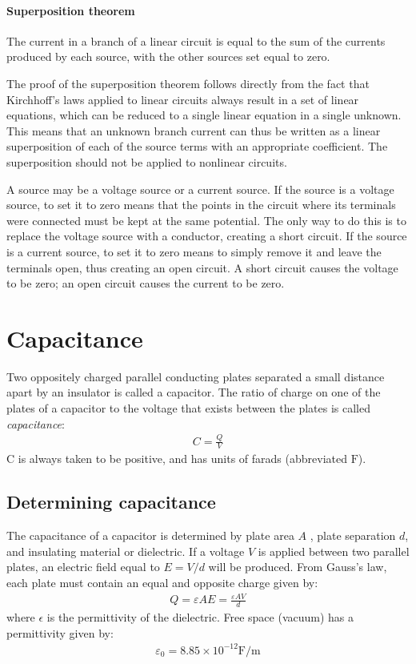 \documentclass[../../document]{subfiles}
\begin{document}
\paragraph*{Superposition theorem}
The current in a branch of a linear circuit is equal to the sum of the currents
produced by each source, with the other sources set equal to zero.
\cite{practical_electronics}

The proof of the superposition theorem follows directly from the fact that
Kirchhoff’s laws applied to linear circuits always result in a set of linear
equations, which can be reduced to a single linear equation in a single
unknown. This means that an unknown branch current can thus be written as a
linear superposition of each of the source terms with an appropriate
coefficient. The superposition should not be applied to nonlinear circuits.
\cite{practical_electronics}

A source may be a voltage source or a current source. If the source is a
voltage source, to set it to zero means that the points in the circuit where
its terminals were connected must be kept at the same potential. The only way
to do this is to replace the voltage source with a conductor, creating a short
circuit. If the source is a current source, to set it to zero means to simply
remove it and leave the terminals open, thus creating an open circuit. A short
circuit causes the voltage to be zero; an open circuit causes the current to be
zero. \cite{practical_electronics}

\section{Capacitance}
Two oppositely charged parallel conducting plates separated a small distance
apart by an insulator is called a capacitor. The
ratio of charge on one of the plates of a capacitor to the voltage that exists
between the plates is called \emph{capacitance}: \cite{practical_electronics}
\begin{gather}
	C=\frac{Q}{V}
\end{gather}
C is always taken to be positive, and has units of farads (abbreviated
\(\unit{\farad}\)). \cite{practical_electronics}

\subsection{Determining capacitance}
The capacitance of a capacitor is determined by plate area \(A\) , plate
separation \(d\), and insulating material or dielectric. If a voltage \(V\)  is
applied between two parallel plates, an electric field equal to \(E = V/d\)
will be produced. From Gauss’s law, each plate must contain an equal and
opposite charge given by:
\begin{gather}
	Q=\varepsilon AE = \frac{\varepsilon AV}{d}
\end{gather}
where \(\epsilon\)  is the permittivity of the dielectric.
Free space (vacuum) has a permittivity
given by: \cite{practical_electronics}
\begin{gather}
	\varepsilon_0 = 8.85 \times 10^{-12}\unit{\farad\per\meter}
\end{gather}
\end{document}
